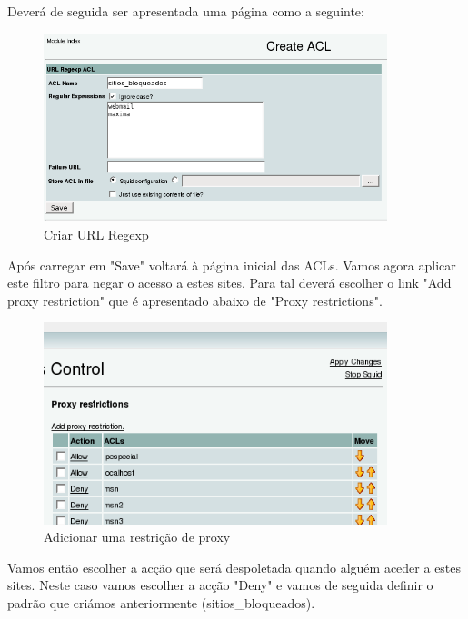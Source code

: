 Deverá de seguida ser apresentada uma página como a seguinte:

\begin{figure}[H]
    \begin{center}
        \includegraphics[width=10cm]{include/img/squid4}
    \end{center}
    \caption{Criar URL Regexp}
    \label{fig:SQUID4}
\end{figure}

Após carregar em "Save" voltará à página inicial das ACLs. Vamos agora aplicar este filtro para negar o acesso a estes sites. Para tal deverá escolher o link "Add proxy restriction" que é apresentado abaixo de "Proxy restrictions".

\begin{figure}[H]
    \begin{center}
        \includegraphics[width=10cm]{include/img/squid5}
    \end{center}
    \caption{Adicionar uma restrição de proxy}
    \label{fig:SQUID5}
\end{figure}

Vamos então escolher a acção que será despoletada quando alguém aceder a estes sites. Neste caso vamos escolher a acção "Deny" e vamos de seguida definir o padrão que criámos anteriormente (sitios\_bloqueados).

